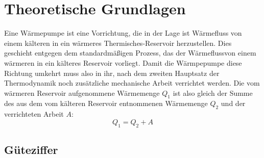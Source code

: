 \section{Theoretische Grundlagen}

Eine Wärmepumpe ist eine Vorrichtung, die in der Lage ist Wärmefluss von einem kälteren in ein
wärmeres Thermisches-Reservoir herzustellen. Dies geschieht entgegen dem standardmäßigen Prozess,
das der Wärmeflussvon einem wärmeren in ein 
kälteres Reservoir vorliegt. Damit die Wärmpepumpe diese Richtung umkehrt muss also in ihr,
nach dem zweiten Hauptsatz der Thermodynamik noch zusätzliche
mechanische Arbeit verrichtet werden.
Die vom wärmeren Reservoir aufgenommene Wärmemenge $Q_1$ ist also gleich der
Summe des aus dem vom kälteren Reservoir entnommenen Wärmemenge $Q_2$ und der verrichteten Arbeit $A$:
\begin{equation}
  Q_1 = Q_2 + A  
  \label{eqn:transp}
\end{equation}

\subsection{Güteziffer}

